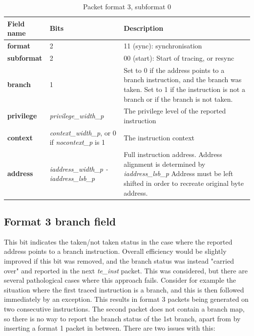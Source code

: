 \begin{table}[htp]
  \centering
  \caption{Packet format 3, subformat 0}
  \label{tab:te_inst3-0}
  \begin{tabulary}{\textwidth}{|l|p{35mm}|p{90mm}|}
    \hline
    {\bf Field name} & {\bf Bits} & {\bf Description} \\
    \hline
    \textbf{format} & 2 & 11 (sync): synchronisation\\
    \hline
    \textbf{subformat} & 2 & 00 (start): Start of tracing, or resync \\
    \hline
    \textbf{branch} & 1 & Set to 0 if the address points to a branch instruction, and the branch was taken.  
              Set to 1 if the instruction is not a branch or if the branch is not taken. \\
    \hline
    \textbf{privilege} & \textit {privilege\_width\_p} & 
                The privilege level of the reported instruction\\
    \hline
    \textbf{context} &  \textit {context\_width\_p}, 
               or 0 if \textit {nocontext\_p} is 1 & 
               The instruction context \\
    \hline
    \textbf{address} & \textit {iaddress\_width\_p - iaddress\_lsb\_p} & 
              Full instruction address.  Address alignment is determined by \textit {iaddress\_lsb\_p} Address must be left shifted in order to recreate original byte address. \\
    \hline
  \end{tabulary}
\end{table}

\subsection{Format 3 \textbf{branch} field}

This bit indicates the taken/not taken status in the case where the reported address points to a branch instruction.
Overall efficiency would be slightly improved if this bit was removed, and the branch status was instead 
"carried over" and reported in the next \textit{te\_inst} packet.  This was considered, but there are several
pathological cases where this approach fails.  Consider for example the situation where the first traced instruction
is a branch, and this is then followed immediately by an exception.  This results in format 3 packets being generated 
on two consecutive instructions.  The second packet does not contain a branch
map, so there is no way to report the branch status of the 1st branch, apart from by inserting a format 1 packet in 
between.  There are two issues with this:

